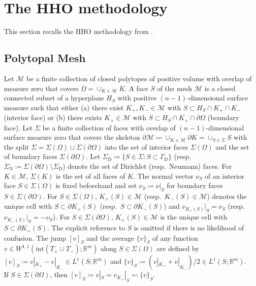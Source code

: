 \documentclass[a4paper]{amsart}
\numberwithin{equation}{section}
\newcommand{\R}{\mathbb{R}}
\newcommand{\Mcal}{\mathcal{M}}
\theoremstyle{remark}
\begin{document}
\section{The HHO methodology}\label{sec:skeletal-method}
This section recalls the HHO methodology from \cite{DiPietroErnLemaire2014,DiPietroErn2015,DiPietroDroniou2020}.

\subsection{Polytopal Mesh}\label{sec:triangulation}
Let $\mathcal{M}$ be a finite collection of closed polytopes of positive volume with overlap of measure zero that covers $\overline{\Omega} = \cup_{K \in \mathcal{M}} K$.
A face $S$ of the mesh $\mathcal{M}$ is a closed connected subset of a hyperplane $H_S$ with positive $(n-1)$-dimensional surface measure such that either (a) there exist $K_+,K_- \in \mathcal{M}$ with $S \subset H_S \cap K_+ \cap K_-$ (interior face) or (b) there exists $K_+ \in \mathcal{M}$ with $S \subset H_S \cap K_+ \cap \partial \Omega$ (boundary face).
Let $\Sigma$ be a finite collection of faces with overlap of $(n-1)$-dimensional surface measure zero that covers the skeleton $\partial \Mcal \coloneqq \cup_{K \in \mathcal{M}} \partial K = \cup_{S \in \Sigma} S$ with the split $\Sigma = \Sigma(\Omega) \cup \Sigma(\partial \Omega)$ into the set of interior faces $\Sigma(\Omega)$ and the set of boundary faces $\Sigma(\partial \Omega)$.
Let $\Sigma_\mathrm{D} \coloneqq \{S \in \Sigma: S \subset \Gamma_\mathrm{D}\}$ (resp.~$\Sigma_\mathrm{N} \coloneqq \Sigma(\partial\Omega) \setminus \Sigma_\mathrm{D}$) denote the set of Dirichlet (resp.~Neumann) faces. For $K \in \mathcal{M}$, $\Sigma(K)$ is the set of all faces of $K$.
The normal vector $\nu_S$ of an interior face $S \in \Sigma(\Omega)$ is fixed beforehand and set $\nu_S \coloneqq \nu|_S$ for boundary faces $S \in \Sigma(\partial \Omega)$.
For $S \in \Sigma(\Omega)$, $K_+(S) \in \Mcal$ (resp.~$K_-(S) \in \Mcal$) denotes the unique cell with $S \subset \partial K_{+}(S)$ (resp.~$S \subset \partial K_-(S)$) and $\nu_{K_+(S)}|_S = \nu_S$ (resp.~$\nu_{K_-(S)}|_S = -\nu_S$).
For $S \in \Sigma(\partial \Omega)$, $K_+(S) \in \Mcal$ is the unique cell with $S \subset \partial K_+(S)$.
The explicit reference to $S$ is omitted if there is no likelihood of confusion.
The jump $[v]_S$ and the average $\{v\}_S$ of any function $v \in W^{1,1}(\mathrm{int}(T_+ \cup T_-);\R^m)$ along $S \in \Sigma(\Omega)$ are defined by $[v]_S \coloneqq v|_{K_+} - v|_{K_-} \in L^1(S;\R^m)$ and $\{v\}_S \coloneqq (v|_{K_+} + v|_{K_-})/2 \in L^1(S;\R^m)$.
If $S \in \Sigma(\partial \Omega)$, then $[v]_S \coloneqq v|_S = v_{K_+}|_S \eqqcolon \{v\}_S$.
\end{document}
